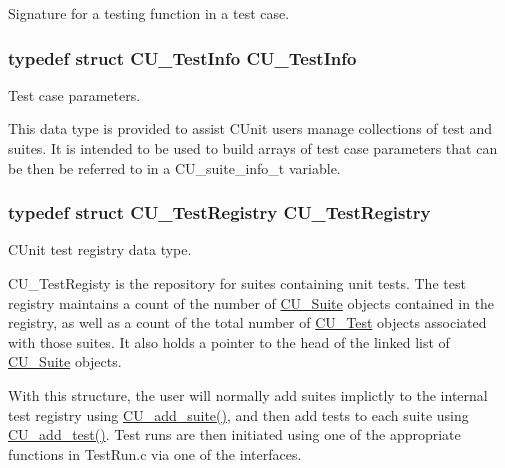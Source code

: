 Signature for a testing function in a test case. 

\hypertarget{group___framework_gad5892aef99bf82d4be23b9284531382d}{
\subsubsection[{C\+U\+\_\+\+Test\+Info}]{\setlength{\rightskip}{0pt plus 5cm}typedef struct {\bf C\+U\+\_\+\+Test\+Info}  {\bf C\+U\+\_\+\+Test\+Info}}}\label{group___framework_gad5892aef99bf82d4be23b9284531382d}


Test case parameters. 

This data type is provided to assist C\+Unit users manage collections of test and suites. It is intended to be used to build arrays of test case parameters that can be then be referred to in a C\+U\+\_\+suite\+\_\+info\+\_\+t variable. \hypertarget{group___framework_ga9a7758811da313b88b23c6e6fdc537a0}{
\subsubsection[{C\+U\+\_\+\+Test\+Registry}]{\setlength{\rightskip}{0pt plus 5cm}typedef struct {\bf C\+U\+\_\+\+Test\+Registry}  {\bf C\+U\+\_\+\+Test\+Registry}}}\label{group___framework_ga9a7758811da313b88b23c6e6fdc537a0}


C\+Unit test registry data type. 

C\+U\+\_\+\+Test\+Registy is the repository for suites containing unit tests. The test registry maintains a count of the number of \hyperlink{struct_c_u___suite}{C\+U\+\_\+\+Suite} objects contained in the registry, as well as a count of the total number of \hyperlink{struct_c_u___test}{C\+U\+\_\+\+Test} objects associated with those suites. It also holds a pointer to the head of the linked list of \hyperlink{struct_c_u___suite}{C\+U\+\_\+\+Suite} objects. 

With this structure, the user will normally add suites implictly to the internal test registry using \hyperlink{group___framework_ga94b8f1bbbd93b154a60bb1d43391b48a}{C\+U\+\_\+add\+\_\+suite()}, and then add tests to each suite using \hyperlink{group___framework_gad9f198a8a5fa8cc6870c3c8be873869f}{C\+U\+\_\+add\+\_\+test()}. Test runs are then initiated using one of the appropriate functions in Test\+Run.\+c via one of the interfaces. 

